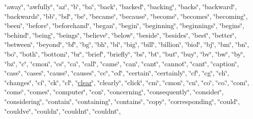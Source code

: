 \char`\"{}away\char`\"{}, \char`\"{}awfully\char`\"{}, \char`\"{}az\char`\"{}, \char`\"{}b\char`\"{}, \char`\"{}ba\char`\"{}, \char`\"{}back\char`\"{}, \char`\"{}backed\char`\"{}, \char`\"{}backing\char`\"{}, \char`\"{}backs\char`\"{}, \char`\"{}backward\char`\"{}, \char`\"{}backwards\char`\"{}, \char`\"{}bb\char`\"{}, \char`\"{}bd\char`\"{}, \char`\"{}be\char`\"{}, \char`\"{}became\char`\"{}, \char`\"{}because\char`\"{}, \char`\"{}become\char`\"{}, \char`\"{}becomes\char`\"{}, \char`\"{}becoming\char`\"{}, \char`\"{}been\char`\"{}, \char`\"{}before\char`\"{}, \char`\"{}beforehand\char`\"{}, \char`\"{}began\char`\"{}, \char`\"{}begin\char`\"{}, \char`\"{}beginning\char`\"{}, \char`\"{}beginnings\char`\"{}, \char`\"{}begins\char`\"{}, \char`\"{}behind\char`\"{}, \char`\"{}being\char`\"{}, \char`\"{}beings\char`\"{}, \char`\"{}believe\char`\"{}, \char`\"{}below\char`\"{}, \char`\"{}beside\char`\"{}, \char`\"{}besides\char`\"{}, \char`\"{}best\char`\"{}, \char`\"{}better\char`\"{}, \char`\"{}between\char`\"{}, \char`\"{}beyond\char`\"{}, \char`\"{}bf\char`\"{}, \char`\"{}bg\char`\"{}, \char`\"{}bh\char`\"{}, \char`\"{}bi\char`\"{}, \char`\"{}big\char`\"{}, \char`\"{}bill\char`\"{}, \char`\"{}billion\char`\"{}, \char`\"{}biol\char`\"{}, \char`\"{}bj\char`\"{}, \char`\"{}bm\char`\"{}, \char`\"{}bn\char`\"{}, \char`\"{}bo\char`\"{}, \char`\"{}both\char`\"{}, \char`\"{}bottom\char`\"{}, \char`\"{}br\char`\"{}, \char`\"{}brief\char`\"{}, \char`\"{}briefly\char`\"{}, \char`\"{}bs\char`\"{}, \char`\"{}bt\char`\"{}, \char`\"{}but\char`\"{}, \char`\"{}buy\char`\"{}, \char`\"{}bv\char`\"{}, \char`\"{}bw\char`\"{}, \char`\"{}by\char`\"{}, \char`\"{}bz\char`\"{}, \char`\"{}c\char`\"{}, \char`\"{}c\textquotesingle{}mon\char`\"{}, \char`\"{}c\textquotesingle{}s\char`\"{}, \char`\"{}ca\char`\"{}, \char`\"{}call\char`\"{}, \char`\"{}came\char`\"{}, \char`\"{}can\char`\"{}, \char`\"{}can\textquotesingle{}t\char`\"{}, \char`\"{}cannot\char`\"{}, \char`\"{}cant\char`\"{}, \char`\"{}caption\char`\"{}, \char`\"{}case\char`\"{}, \char`\"{}cases\char`\"{}, \char`\"{}cause\char`\"{}, \char`\"{}causes\char`\"{}, \char`\"{}cc\char`\"{}, \char`\"{}cd\char`\"{}, \char`\"{}certain\char`\"{}, \char`\"{}certainly\char`\"{}, \char`\"{}cf\char`\"{}, \char`\"{}cg\char`\"{}, \char`\"{}ch\char`\"{}, \char`\"{}changes\char`\"{}, \char`\"{}ci\char`\"{}, \char`\"{}ck\char`\"{}, \char`\"{}cl\char`\"{}, \char`\"{}\mbox{\hyperlink{classio_1_1github_1_1syzygy2048_1_1radcloud_1_1_document_manager_abc50df59a17e5f00dddb60d56760b106}{clear}}\char`\"{}, \char`\"{}clearly\char`\"{}, \char`\"{}click\char`\"{}, \char`\"{}cm\char`\"{}, \char`\"{}cmon\char`\"{}, \char`\"{}cn\char`\"{}, \char`\"{}co\char`\"{}, \char`\"{}co.\char`\"{}, \char`\"{}com\char`\"{}, \char`\"{}come\char`\"{}, \char`\"{}comes\char`\"{}, \char`\"{}computer\char`\"{}, \char`\"{}con\char`\"{}, \char`\"{}concerning\char`\"{}, \char`\"{}consequently\char`\"{}, \char`\"{}consider\char`\"{}, \char`\"{}considering\char`\"{}, \char`\"{}contain\char`\"{}, \char`\"{}containing\char`\"{}, \char`\"{}contains\char`\"{}, \char`\"{}copy\char`\"{}, \char`\"{}corresponding\char`\"{}, \char`\"{}could\char`\"{}, \char`\"{}could\textquotesingle{}ve\char`\"{}, \char`\"{}couldn\char`\"{}, \char`\"{}couldn\textquotesingle{}t\char`\"{}, \char`\"{}couldnt\char`\"{}, 